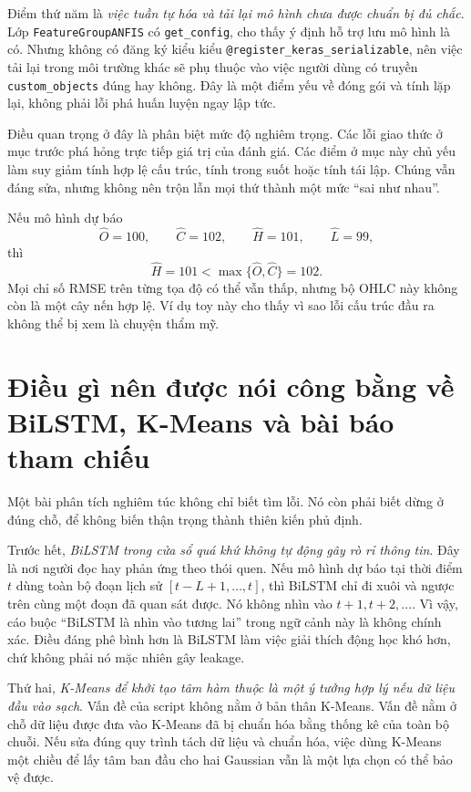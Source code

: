 Điểm thứ năm là \emph{việc tuần tự hóa và tải lại mô hình chưa được chuẩn bị đủ chắc}. Lớp \texttt{FeatureGroupANFIS} có \texttt{get\_config}, cho thấy ý định hỗ trợ lưu mô hình là có. Nhưng không có đăng ký kiểu kiểu \texttt{@register\_keras\_serializable}, nên việc tải lại trong môi trường khác sẽ phụ thuộc vào việc người dùng có truyền \texttt{custom\_objects} đúng hay không. Đây là một điểm yếu về đóng gói và tính lặp lại, không phải lỗi phá huấn luyện ngay lập tức.

Điều quan trọng ở đây là phân biệt mức độ nghiêm trọng. Các lỗi giao thức ở mục trước phá hỏng trực tiếp giá trị của đánh giá. Các điểm ở mục này chủ yếu làm suy giảm tính hợp lệ cấu trúc, tính trong suốt hoặc tính tái lập. Chúng vẫn đáng sửa, nhưng không nên trộn lẫn mọi thứ thành một mức ``sai như nhau''.

\begin{example}
Nếu mô hình dự báo
\[
\widehat O=100,\qquad \widehat C=102,\qquad \widehat H=101,\qquad \widehat L=99,
\]
thì
\[
\widehat H=101<\max\{\widehat O,\widehat C\}=102.
\]
Mọi chỉ số RMSE trên từng tọa độ có thể vẫn thấp, nhưng bộ OHLC này không còn là một cây nến hợp lệ. Ví dụ toy này cho thấy vì sao lỗi cấu trúc đầu ra không thể bị xem là chuyện thẩm mỹ.
\end{example}

\section{Điều gì nên được nói công bằng về BiLSTM, K-Means và bài báo tham chiếu}

Một bài phân tích nghiêm túc không chỉ biết tìm lỗi. Nó còn phải biết dừng ở đúng chỗ, để không biến thận trọng thành thiên kiến phủ định.

Trước hết, \emph{BiLSTM trong cửa sổ quá khứ không tự động gây rò rỉ thông tin}. Đây là nơi người đọc hay phản ứng theo thói quen. Nếu mô hình dự báo tại thời điểm \(t\) dùng toàn bộ đoạn lịch sử \([t-L+1,\dots,t]\), thì BiLSTM chỉ đi xuôi và ngược trên cùng một đoạn đã quan sát được. Nó không nhìn vào \(t+1,t+2,\dots\). Vì vậy, cáo buộc ``BiLSTM là nhìn vào tương lai'' trong ngữ cảnh này là không chính xác. Điều đáng phê bình hơn là BiLSTM làm việc giải thích động học khó hơn, chứ không phải nó mặc nhiên gây leakage.

Thứ hai, \emph{K-Means để khởi tạo tâm hàm thuộc là một ý tưởng hợp lý nếu dữ liệu đầu vào sạch}. Vấn đề của script không nằm ở bản thân K-Means. Vấn đề nằm ở chỗ dữ liệu được đưa vào K-Means đã bị chuẩn hóa bằng thống kê của toàn bộ chuỗi. Nếu sửa đúng quy trình tách dữ liệu và chuẩn hóa, việc dùng K-Means một chiều để lấy tâm ban đầu cho hai Gaussian vẫn là một lựa chọn có thể bảo vệ được.

